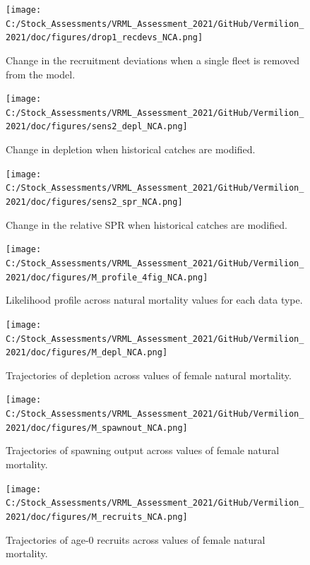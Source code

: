 \documentclass[
  english,
  a4paper,
]{article}
\begin{document}
\begin{figure}
\centering
\texttt{[image: C:/Stock\_Assessments/VRML\_Assessment\_2021/GitHub/Vermilion\_2021/doc/figures/drop1\_recdevs\_NCA.png]}
\caption{Change in the recruitment deviations when a single fleet is removed from the model.\label{fig:drop-recdev}}
\end{figure}

\begin{figure}
\centering
\texttt{[image: C:/Stock\_Assessments/VRML\_Assessment\_2021/GitHub/Vermilion\_2021/doc/figures/sens2\_depl\_NCA.png]}
\caption{Change in depletion when historical catches are modified.\label{fig:sens2-depl}}
\end{figure}

\begin{figure}
\centering
\texttt{[image: C:/Stock\_Assessments/VRML\_Assessment\_2021/GitHub/Vermilion\_2021/doc/figures/sens2\_spr\_NCA.png]}
\caption{Change in the relative SPR when historical catches are modified.\label{fig:sens2-spr}}
\end{figure}

\begin{figure}
\centering
\texttt{[image: C:/Stock\_Assessments/VRML\_Assessment\_2021/GitHub/Vermilion\_2021/doc/figures/M\_profile\_4fig\_NCA.png]}
\caption{Likelihood profile across natural mortality values for each data type.\label{fig:m-profile}}
\end{figure}

\begin{figure}
\centering
\texttt{[image: C:/Stock\_Assessments/VRML\_Assessment\_2021/GitHub/Vermilion\_2021/doc/figures/M\_depl\_NCA.png]}
\caption{Trajectories of depletion across values of female natural mortality.\label{fig:m-depl}}
\end{figure}

\begin{figure}
\centering
\texttt{[image: C:/Stock\_Assessments/VRML\_Assessment\_2021/GitHub/Vermilion\_2021/doc/figures/M\_spawnout\_NCA.png]}
\caption{Trajectories of spawning output across values of female natural mortality.\label{fig:m-spawn}}
\end{figure}

\begin{figure}
\centering
\texttt{[image: C:/Stock\_Assessments/VRML\_Assessment\_2021/GitHub/Vermilion\_2021/doc/figures/M\_recruits\_NCA.png]}
\caption{Trajectories of age-0 recruits across values of female natural mortality.\label{fig:m-recruits}}
\end{figure}
\end{document}
